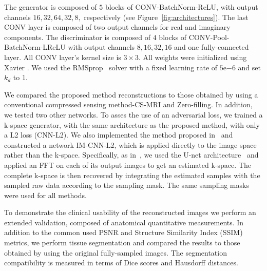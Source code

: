 \documentclass[review]{elsarticle}
\begin{document}
The generator is composed of $5$ blocks of CONV-BatchNorm-ReLU, with output channels $16,32,64,32,8,$ respectively (see Figure~\ref{fig:architectures}). The last CONV layer is composed of two output channels for real and imaginary components. The discriminator is composed of $4$ blocks of CONV-Pool-BatchNorm-LReLU with output channels $8,16,32,16$ and one fully-connected layer. All CONV layer's kernel size is $3\times3$. All weights were initialized using Xavier \cite{glorot2010understanding}. We used the RMSprop~\cite{tieleman2012lecture} solver with a fixed learning rate of $5\mathrm{e}{-6}$ and set $k_{d}$ to 1.

We compared the proposed method reconstructions to those obtained by using a conventional compressed sensing method-CS-MRI \cite{lustig2007sparse} and Zero-filling. In addition, we tested two other networks. To asses the use of an adversarial loss, we trained a k-space generator, with the same architecture as the proposed method, with only a L2 loss (CNN-L2). We also implemented the method proposed in~\cite{hyun2017deep} and constructed a network IM-CNN-L2, which is applied directly to the image space rather than the k-space. Specifically, as in~\cite{hyun2017deep}, we used the U-net architecture~\cite{ronneberger2015u} and applied an FFT on each of its output images to get an estimated k-space. The complete k-space is then recovered by integrating the estimated samples with the sampled raw data according to the sampling mask. The same sampling masks were used for all methods.

To demonstrate the clinical usability of the reconstructed images we perform an extended validation, composed of anatomical quantitative measurements. In addition to the common used PSNR and Structure Similarity Index (SSIM)~\cite{wang2004image} metrics, we perform tissue segmentation and compared the results to those obtained by using the original fully-sampled images. The segmentation compatibility is measured in terms of Dice scores and Hausdorff distances.
\end{document}
